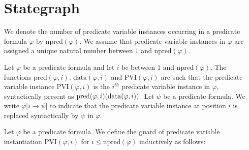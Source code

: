                       

\section{Stategraph}

We denote the number of predicate variable instances occurring in a
predicate formula $\varphi $ by $\mathrm{npred}(\varphi )$. We assume that
predicate variable instances in $\varphi $ are assigned a unique natural
number between $1$ and $\mathrm{npred}(\varphi )$.

\begin{definition}
Let $\varphi $ be a predicate formula and let $i$ be between $1$ and $%
\mathrm{npred}(\varphi )$. The functions $\mathrm{pred}(\varphi ,i)$, $%
\mathrm{data}(\varphi ,i)$ and $\mathrm{PVI}(\varphi ,i)$ are such that the
predicate variable instance $\mathrm{PVI}(\varphi ,i)$ is the $i^{th}$
predicate variable instance in $\varphi $, syntactically present as $\mathrm{%
pred}(\varphi ,i)(\mathrm{data}(\varphi ,i))$. Let $\psi $ be a predicate
formula. We write $\varphi \lbrack i\rightarrow \psi ]$ to indicate that the
predicate variable instance at position $i$ is replaced syntactically by $%
\psi $ in $\varphi $.
\end{definition}

\begin{definition}
Let $\varphi $ be a predicate formula. We define the guard of predicate
variable instantiation $\mathrm{PVI}(\varphi ,i)$ for $i\leq \mathrm{npred}%
(\varphi )$ inductively as follows:
\end{definition}

